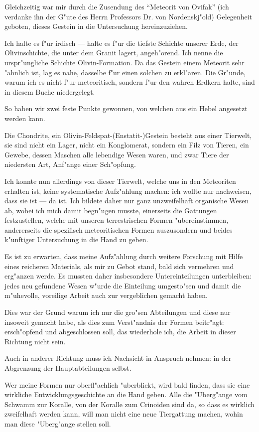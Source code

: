 \documentclass[a4paper, 11pt, oneside]{article}
\begin{document}
Gleichzeitig war mir durch die Zusendung des "`Meteorit von Ovifak"' (ich verdanke ihn der G"ute des Herrn Professors Dr. von Nordenskj"old) Gelegenheit geboten, dieses Gestein in die Untersuchung hereinzuziehen.

Ich halte es f"ur irdisch --- halte es f"ur die tiefste Schichte unserer Erde, der Olivinschichte, die unter dem Granit lagert, angeh"orend. Ich nenne die urspr"ungliche Schichte Olivin-Formation. Da das Gestein einem Meteorit sehr "ahnlich ist, lag es nahe, dasselbe f"ur einen solchen zu erkl"aren. Die Gr"unde, warum ich es nicht f"ur meteoritisch, sondern f"ur den wahren Erdkern halte, sind in diesem Buche niedergelegt.

So haben wir zwei feste Punkte gewonnen, von welchen aus ein Hebel angesetzt werden kann.

Die Chondrite, ein Olivin-Feldspat-(Enstatit-)Gestein besteht aus einer Tierwelt, sie sind nicht ein Lager, nicht ein Konglomerat, sondern ein Filz von Tieren, ein Gewebe, dessen Maschen alle lebendige Wesen waren, und zwar Tiere der niedersten Art, Anf"ange einer Sch"opfung.

Ich konnte nun allerdings von dieser Tierwelt, welche uns in den Meteoriten erhalten ist, keine systematische Aufz"ahlung machen: ich wollte nur nachweisen, dass sie ist --- da ist. Ich bildete daher nur ganz unzweifelhaft organische Wesen ab, wobei ich mich damit begn"ugen musste, einerseits die Gattungen festzustellen, welche mit unseren terrestrischen Formen "ubereinstimmen, andererseits die spezifisch meteoritischen Formen auszusondern und beides k"unftiger Untersuchung in die Hand zu geben.

Es ist zu erwarten, dass meine Aufz"ahlung durch weitere Forschung mit Hilfe eines reicheren Materials, als mir zu Gebot stand, bald sich vermehren und erg"anzen werde. Es mussten daher insbesondere Untereinteilungen unterbleiben: jedes neu gefundene Wesen w"urde die Einteilung umgesto"sen und damit die m"uhevolle, voreilige Arbeit auch zur vergeblichen gemacht haben.

Dies war der Grund warum ich nur die gro"sen Abteilungen und diese nur insoweit gemacht habe, als dies zum Verst"andnis der Formen beitr"agt: ersch"opfend und abgeschlossen soll, das wiederhole ich, die Arbeit in dieser Richtung nicht sein.

Auch in anderer Richtung muss ich Nachsicht in Anspruch nehmen: in der Abgrenzung der Hauptabteilungen selbst.

Wer meine Formen nur oberfl"achlich "uberblickt, wird bald finden, dass sie eine wirkliche Entwicklungsgeschichte an die Hand geben. Alle die "Uberg"ange vom Schwamm zur Koralle, von der Koralle zum Crinoiden sind da, so dass es wirklich zweifelhaft werden kann, will man nicht eine neue Tiergattung machen, wohin man diese "Uberg"ange stellen soll.
\end{document}
